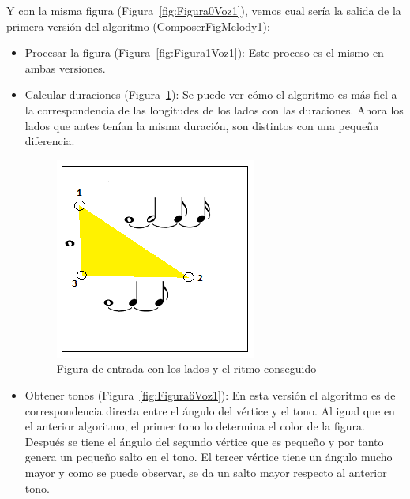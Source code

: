 Y con la misma figura (Figura~\ref{fig:Figura0Voz1}), vemos cual sería la salida de la primera versión del algoritmo (ComposerFigMelody1):

\begin{itemize}
	
	\item Procesar la figura (Figura~\ref{fig:Figura1Voz1}): Este proceso es el mismo en ambas versiones. \\
	
	\item Calcular duraciones (Figura~\ref{fig:Figura5Voz1}): Se puede ver cómo el algoritmo es más fiel a la correspondencia de las longitudes de los lados con las duraciones. Ahora los lados que antes tenían la misma duración, son distintos con una pequeña diferencia.\\
		
		\begin{figure}[!htbp]
		\centering
		\hspace*{0.0in}
		\includegraphics[scale=1]{graphics/simpletest1-F2_2.png}
		\caption{Figura de entrada con los lados y el ritmo conseguido}
		\label{fig:Figura5Voz1}
		\end{figure}

	\item Obtener tonos  (Figura~\ref{fig:Figura6Voz1}): En esta versión el algoritmo es de correspondencia directa entre el ángulo del vértice y el tono. Al igual que en el anterior algoritmo, el primer tono lo determina el color de la figura. Después se tiene el ángulo del segundo vértice que es pequeño y por tanto genera un pequeño salto en el tono. El tercer vértice tiene un ángulo mucho mayor y como se puede observar, se da un salto mayor respecto al anterior tono.
	

\end{itemize}
